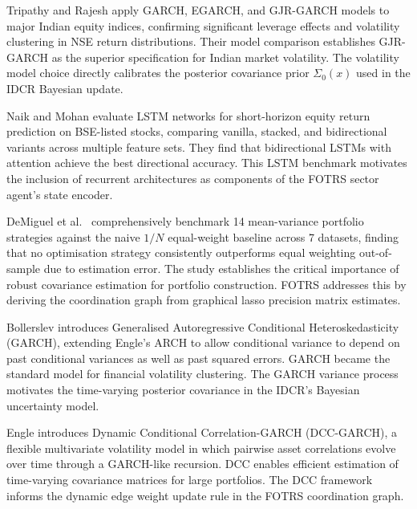 \documentclass[12pt,a4paper,oneside]{report}
\theoremstyle{definition}
\theoremstyle{remark}
\begin{document}
\medskip

\noindent Tripathy and Rajesh \cite{Tripathy2021NiftyVolatility} apply GARCH, EGARCH, and GJR-GARCH models to major Indian equity indices, confirming significant leverage effects and volatility clustering in NSE return distributions. Their model comparison establishes GJR-GARCH as the superior specification for Indian market volatility. The volatility model choice directly calibrates the posterior covariance prior $\Sigma_0(x)$ used in the IDCR Bayesian update.

\medskip

\noindent Naik and Mohan \cite{Naik2021LSTM} evaluate LSTM networks for short-horizon equity return prediction on BSE-listed stocks, comparing vanilla, stacked, and bidirectional variants across multiple feature sets. They find that bidirectional LSTMs with attention achieve the best directional accuracy. This LSTM benchmark motivates the inclusion of recurrent architectures as components of the FOTRS sector agent's state encoder.

\medskip

\noindent DeMiguel et al.\ \cite{DeMiguel2009Portfolio} comprehensively benchmark 14 mean-variance portfolio strategies against the naive $1/N$ equal-weight baseline across 7 datasets, finding that no optimisation strategy consistently outperforms equal weighting out-of-sample due to estimation error. The study establishes the critical importance of robust covariance estimation for portfolio construction. FOTRS addresses this by deriving the coordination graph from graphical lasso precision matrix estimates.

\medskip

\noindent Bollerslev \cite{Bollerslev1986GARCH} introduces Generalised Autoregressive Conditional Heteroskedasticity (GARCH), extending Engle's ARCH to allow conditional variance to depend on past conditional variances as well as past squared errors. GARCH became the standard model for financial volatility clustering. The GARCH variance process motivates the time-varying posterior covariance in the IDCR's Bayesian uncertainty model.

\medskip

\noindent Engle \cite{Engle2002DCC} introduces Dynamic Conditional Correlation-GARCH (DCC-GARCH), a flexible multivariate volatility model in which pairwise asset correlations evolve over time through a GARCH-like recursion. DCC enables efficient estimation of time-varying covariance matrices for large portfolios. The DCC framework informs the dynamic edge weight update rule in the FOTRS coordination graph.
\end{document}
